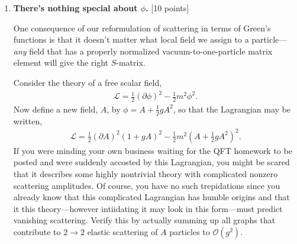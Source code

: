 \documentclass[12pt]{article}
\begin{document}
\begin{enumerate}
%
%
%
\item {\bf There's nothing special about $\phi$.} [10 points] 

One consequence of our reformulation of scattering in terms of Green's functions is that it doesn't matter what local field we assign to a particle---\textit{any} field that has a properly normalized vacuum-to-one-particle matrix element will give the right $S$-matrix. 

Consider the theory of a free scalar field,
\begin{align*}
 \mathcal L = \frac 12 (\partial \phi)^2 - \frac 12 m^2 \phi^2.
\end{align*}
Now define a new field, $A$, by $\phi = A + \frac 12 g A^2$, so that the Lagrangian may be written,
\begin{align*}
\mathcal L = \frac 12 (\partial A)^2 (1+gA)^2 - \frac 12 m^2 \left(A+\frac 12 g A^2\right)^2.
\end{align*}
If you were minding your own business waiting for the QFT homework to be posted and were suddenly accosted by this Lagrangian, you might be scared that it describes some highly nontrivial theory with complicated nonzero scattering amplitudes. Of course, you have no such trepidations since you already know that this complicated Lagrangian has humble origins and that it this theory---however intiidating it may look in this form---must predict vanishing scattering. Verify this by actually summing up all graphs that contribute to $2\to 2$ elastic scattering of $A$ particles to $\mathcal O(g^2)$. 


\end{enumerate}
\end{document}
